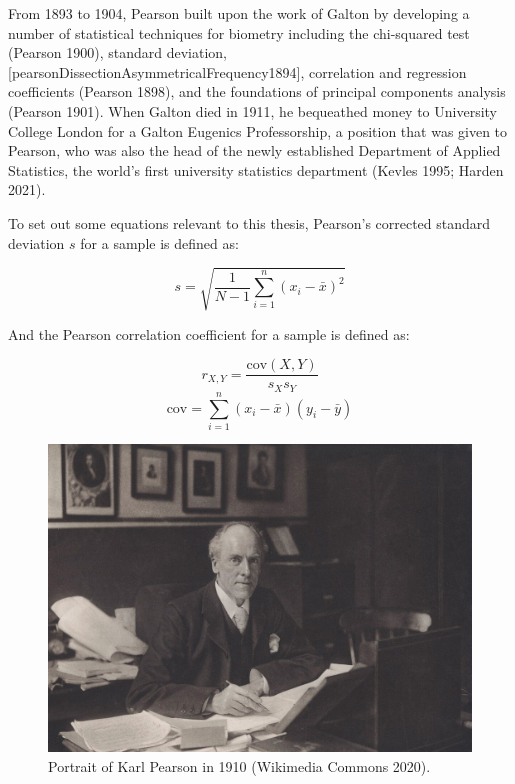 \documentclass[
]{book}
\begin{document}
From 1893 to 1904, Pearson built upon the work of Galton by developing a number of statistical techniques for biometry including the chi-squared test (Pearson 1900), standard deviation, {[}pearsonDissectionAsymmetricalFrequency1894{]}, correlation and regression coefficients (Pearson 1898), and the foundations of principal components analysis (Pearson 1901). When Galton died in 1911, he bequeathed money to University College London for a Galton Eugenics Professorship, a position that was given to Pearson, who was also the head of the newly established Department of Applied Statistics, the world's first university statistics department (Kevles 1995; Harden 2021).

To set out some equations relevant to this thesis, Pearson's corrected standard deviation \(s\) for a sample is defined as:

\begin{equation}
s = \sqrt{\frac{1}{N-1}{\sum_{i=1} ^n (x_i - \bar{x})^2}} \label{eq:sd}
\end{equation}

And the Pearson correlation coefficient for a sample is defined as:

\begin{equation}
r_{X,Y} = \frac{\mathrm{cov}(X,Y)}{s_X s_Y} \label{eq:cor}
\end{equation}
\begin{equation}
\mathrm{cov} = \sum_{i=1} ^n (x_i - \bar{x})(y_i - \bar{y})
\end{equation}



\begin{figure}

{\centering \includegraphics[width=0.7\linewidth]{figs/introduction/Karl_Pearson_1910} 

}

\caption{Portrait of Karl Pearson in 1910 (Wikimedia Commons 2020).}\label{fig:pearson}
\end{figure}
\end{document}
